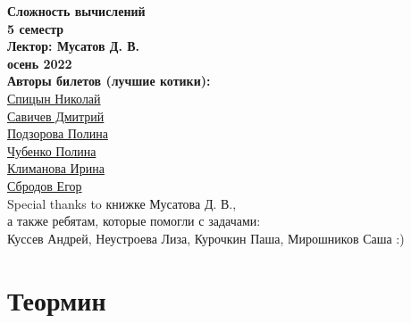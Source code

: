 


    \thispagestyle{empty}
    \BgThispage
    \begin{center}
        \vspace*{4cm}
        
        \Huge
        \textbf{Сложность вычислений } \\
        \textbf{5 семестр} \\
        \textbf{Лектор: Мусатов Д. В.} \\
        \textbf{осень 2022} \\
        
        \vspace{7cm}
        \Large 
        \textbf{Авторы билетов (лучшие котики):} \\
        \href{https://vk.com/spitsynn}{Спицын Николай} \\
        \href{https://vk.com/dimasav123}{Савичев Дмитрий} \\
        \href{https://vk.com/id165779384}{Подзорова Полина} \\
        \href{https://vk.com/poli.dobro}{Чубенко Полина} \\        
        \href{https://vk.com/meraklim}{Климанова Ирина} \\
        \href{https://vk.com/ulegor}{Сбродов Егор} \\
        Special thanks to книжке Мусатова Д. В., \\
        а также ребятам, которые помогли с задачами: \\
        Куссев Андрей, Неустроева Лиза, Курочкин Паша, Мирошников Саша :)
        
    \end{center}

\newpage

\tableofcontents
\newpage

\setcounter{part}{-1}
\part{Теормин}

